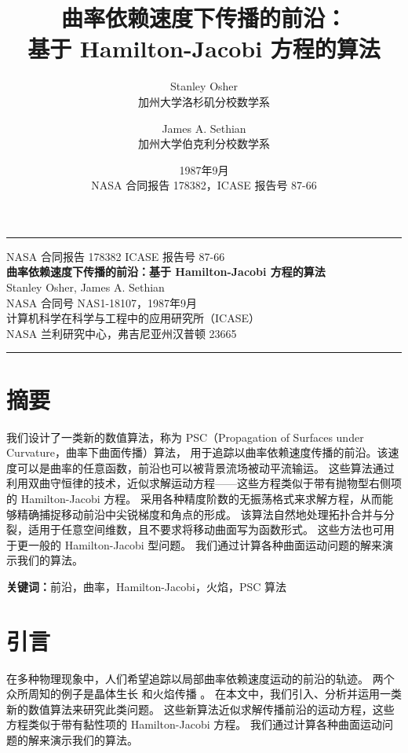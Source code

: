 \documentclass[11pt,a4paper]{article}
\title{\heiti 曲率依赖速度下传播的前沿：\\
基于 Hamilton-Jacobi 方程的算法}
\author{
    Stanley Osher \\
    {\small 加州大学洛杉矶分校数学系} \\
    \and
    James A. Sethian \\
    {\small 加州大学伯克利分校数学系}
}
\date{1987年9月 \\ {\small NASA 合同报告 178382，ICASE 报告号 87-66}}
\begin{document}
\maketitle

\begin{center}
\rule{0.6\textwidth}{0.4pt}
\small
NASA 合同报告 178382 \quad ICASE 报告号 87-66 \\[4pt]
\textbf{曲率依赖速度下传播的前沿：基于 Hamilton-Jacobi 方程的算法} \\[4pt]
Stanley Osher, James A. Sethian \\[4pt]
NASA 合同号 NAS1-18107，1987年9月 \\[4pt]
计算机科学在科学与工程中的应用研究所（ICASE）\\
NASA 兰利研究中心，弗吉尼亚州汉普顿 23665
\rule{0.6\textwidth}{0.4pt}
\end{center}

\vspace{1cm}

\section*{摘要}

我们设计了一类新的数值算法，称为 PSC（Propagation of Surfaces under Curvature，曲率下曲面传播）算法，
用于追踪以曲率依赖速度传播的前沿。该速度可以是曲率的任意函数，前沿也可以被背景流场被动平流输运。
这些算法通过利用双曲守恒律的技术，近似求解运动方程——这些方程类似于带有抛物型右侧项的 Hamilton-Jacobi 方程。
采用各种精度阶数的无振荡格式来求解方程，从而能够精确捕捉移动前沿中尖锐梯度和角点的形成。
该算法自然地处理拓扑合并与分裂，适用于任意空间维数，且不要求将移动曲面写为函数形式。
这些方法也可用于更一般的 Hamilton-Jacobi 型问题。
我们通过计算各种曲面运动问题的解来演示我们的算法。

\medskip
\noindent\textbf{关键词：}前沿，曲率，Hamilton-Jacobi，火焰，PSC 算法

\newpage

\section{引言}
\label{sec:intro}

在多种物理现象中，人们希望追踪以局部曲率依赖速度运动的前沿的轨迹。
两个众所周知的例子是晶体生长 \cite{chorin1985, langer1980, langer1983, mullins1963, mullins1965, nichols1965, pamphlin1975, turnbull1956} 
和火焰传播 \cite{frankel1982, landau1944, markstein1951, markstein1964, sethian1984, sivashinsky1977, zeldovich1981}。
在本文中，我们引入、分析并运用一类新的数值算法来研究此类问题。
这些新算法近似求解传播前沿的运动方程，这些方程类似于带有黏性项的 Hamilton-Jacobi 方程。
我们通过计算各种曲面运动问题的解来演示我们的算法。
\end{document}
